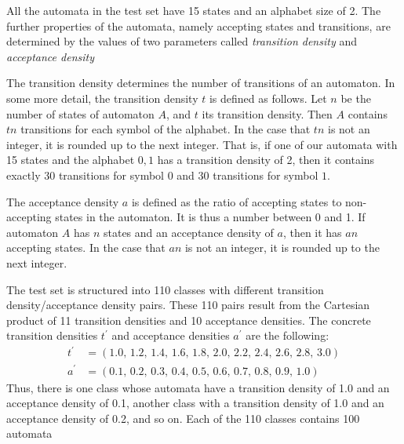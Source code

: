 All the automata in the test set have 15 states and an alphabet size of 2. The further properties of the automata, namely accepting states and transitions, are determined by the values of two parameters called \textit{transition density} and \textit{acceptance density}

The transition density determines the number of transitions of an automaton. In some more detail, the transition density $t$ is defined as follows. Let $n$ be the number of states of automaton $A$, and $t$ its transition density. Then $A$ contains $tn$ transitions for each symbol of the alphabet. In the case that $tn$ is not an integer, it is rounded up to the next integer. That is, if one of our automata with 15 states and the alphabet ${0, 1}$ has a transition density of 2, then it contains exactly 30 transitions for symbol $0$ and 30 transitions for symbol $1$. %

The acceptance density $a$ is defined as the ratio of accepting states to non-accepting states in the automaton. It is thus a number between 0 and 1. If automaton $A$ has $n$ states and an acceptance density of $a$, then it has $an$ accepting states. In the case that $an$ is not an integer, it is rounded up to the next integer. %

The \goal{} test set is structured into 110 classes with different transition density/acceptance density pairs. These 110 pairs result from the Cartesian product of 11 transition densities and 10 acceptance densities. The concrete transition densities $t^\prime$ and acceptance densities $a^\prime$ are the following:
\begin{align*}
t^\prime & = \left( 1.0,\,1.2,\,1.4,\,1.6,\,1.8,\,2.0,\,2.2,\,2.4,\,2.6,\,2.8,\,3.0 \right) \\
a^\prime & = \left( 0.1,\,0.2,\,0.3,\,0.4,\,0.5,\,0.6,\,0.7,\,0.8,\,0.9,\,1.0 \right)
\end{align*}
Thus, there is one class whose automata have a transition density of 1.0 and an acceptance density of 0.1, another class with a transition density of 1.0 and an acceptance density of 0.2, and so on. Each of the 110 classes contains 100 automata

